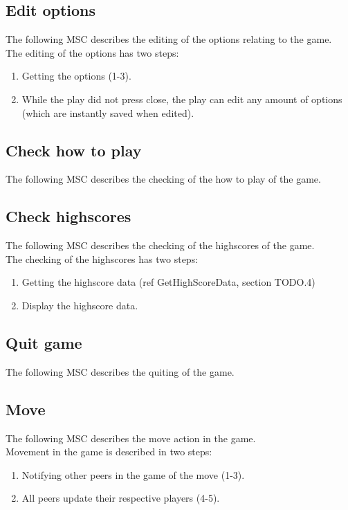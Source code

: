 \documentclass[a4paper,twoside,11pt]{article}
\begin{document}
\subsection{Edit options}
The following MSC describes the editing of the options relating to the game.\\
The editing of the options has two steps:
\begin{enumerate}
\item Getting the options (1-3).
\item While the play did not press close, the play can edit any amount of options (which are instantly saved when edited).
\end{enumerate}

\subsection{Check how to play}
The following MSC describes the checking of the how to play of the game.\\

\subsection{Check highscores}
The following MSC describes the checking of the highscores of the game.\\
The checking of the highscores has two steps:
\begin{enumerate}
\item Getting the highscore data (ref GetHighScoreData, section TODO.4)
\item Display the highscore data.
\end{enumerate}

\subsection{Quit game}
The following MSC describes the quiting of the game.\\

\subsection{Move}
The following MSC describes the move action in the game.\\
Movement in the game is described in two steps:
\begin{enumerate}
\item Notifying other peers in the game of the move (1-3).
\item All peers update their respective players (4-5).
\end{enumerate}
\end{document}

